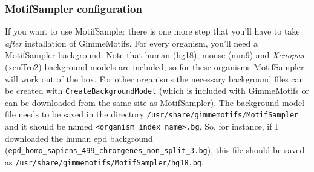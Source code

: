 \documentclass[11pt]{article}
\begin{document}
\subsubsection{MotifSampler configuration}
\label{sec:MotifSampler}
If you want to use MotifSampler there is one more step that you'll have to take \emph{after} installation of GimmeMotifs. For every organism, you'll need a MotifSampler background. Note that human (hg18), mouse (mm9) and \textit{Xenopus} (xenTro2) background models are included, so for these organisms MotifSampler will work out of the box. For other organisms the necessary background files can be created with \texttt{CreateBackgroundModel} (which is included with GimmeMotifs or can be downloaded from the same site as MotifSampler). The background model file needs to be saved in the directory \texttt{/usr/share/gimmemotifs/MotifSampler} and it should be named \texttt{<organism\_index\_name>.bg}. So, for instance, if I downloaded the human epd background (\texttt{epd\_homo\_sapiens\_499\_chromgenes\_non\_split\_3.bg}), this file should be saved as \texttt{/usr/share/gimmemotifs/MotifSampler/hg18.bg}.
\end{document}
